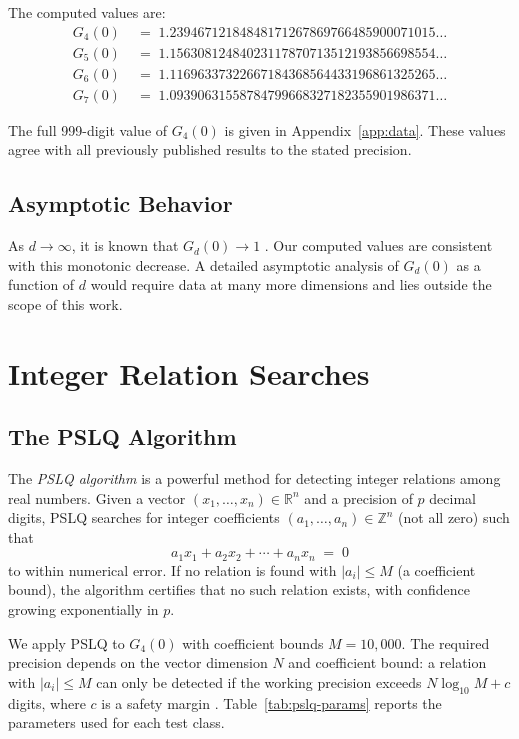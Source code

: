 \documentclass[12pt,a4paper]{article}
\numberwithin{equation}{section}
\theoremstyle{plain}
\theoremstyle{definition}
\theoremstyle{remark}
\newcommand{\R}{\mathbb{R}}
\newcommand{\Z}{\mathbb{Z}}
\begin{document}
The computed values are:
\begin{align}
  G_4(0) &\;=\; 1.23946712184848171267869766485900071015\ldots \label{eq:g4-value} \\
  G_5(0) &\;=\; 1.15630812484023117870713512193856698554\ldots \label{eq:g5-value} \\
  G_6(0) &\;=\; 1.11696337322667184368564433196861325265\ldots \label{eq:g6-value} \\
  G_7(0) &\;=\; 1.09390631558784799668327182355901986371\ldots \label{eq:g7-value}
\end{align}

The full 999-digit value of $G_4(0)$ is given in Appendix~\ref{app:data}. These values
agree with all previously published results \cite{Guttmann2009,Zucker2011} to the stated precision.

\subsection{Asymptotic Behavior}

As $d \to \infty$, it is known that $G_d(0) \to 1$ \cite{Guttmann2009}. Our computed values
are consistent with this monotonic decrease. A detailed asymptotic analysis of $G_d(0)$
as a function of $d$ would require data at many more dimensions and lies outside the scope of this work.

\section{Integer Relation Searches}\label{sec:pslq}

\subsection{The PSLQ Algorithm}

The \emph{PSLQ algorithm} \cite{Ferguson1999} is a powerful method for detecting integer relations
among real numbers. Given a vector $(x_1, \ldots, x_n) \in \R^n$ and a precision of $p$ decimal digits,
PSLQ searches for integer coefficients $(a_1, \ldots, a_n) \in \Z^n$ (not all zero) such that
\[
  a_1 x_1 + a_2 x_2 + \cdots + a_n x_n \;=\; 0
\]
to within numerical error. If no relation is found with $|a_i| \leq M$ (a coefficient bound),
the algorithm certifies that no such relation exists, with confidence growing exponentially in $p$.

We apply PSLQ to $G_4(0)$ with coefficient bounds $M = 10{,}000$.
The required precision depends on the vector dimension $N$ and coefficient bound:
a relation with $|a_i| \leq M$ can only be detected if the working precision
exceeds $N \log_{10} M + c$ digits, where $c$ is a safety margin \cite{Ferguson1999}.
Table~\ref{tab:pslq-params} reports the parameters used for each test class.
\end{document}
